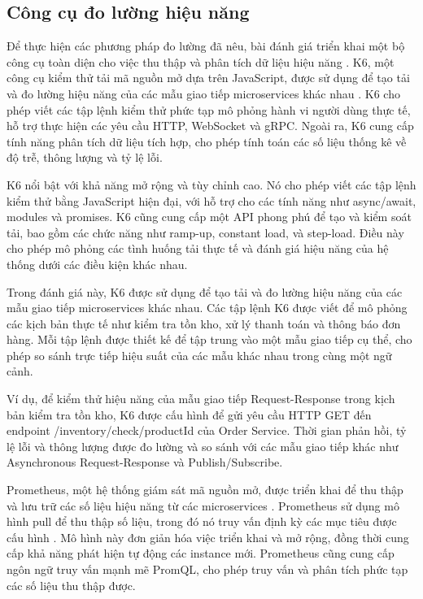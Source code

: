 \subsection{Công cụ đo lường hiệu năng}
Để thực hiện các phương pháp đo lường đã nêu, bài đánh giá triển khai một bộ công cụ toàn diện cho việc thu thập và phân tích dữ liệu hiệu năng \cite{aksakalli2021}. K6, một công cụ kiểm thử tải mã nguồn mở dựa trên JavaScript, được sử dụng để tạo tải và đo lường hiệu năng của các mẫu giao tiếp microservices khác nhau \cite{jun2018}. K6 cho phép viết các tập lệnh kiểm thử phức tạp mô phỏng hành vi người dùng thực tế, hỗ trợ thực hiện các yêu cầu HTTP, WebSocket và gRPC. Ngoài ra, K6 cung cấp tính năng phân tích dữ liệu tích hợp, cho phép tính toán các số liệu thống kê về độ trễ, thông lượng và tỷ lệ lỗi.

K6 nổi bật với khả năng mở rộng và tùy chỉnh cao. Nó cho phép viết các tập lệnh kiểm thử bằng JavaScript hiện đại, với hỗ trợ cho các tính năng như async/await, modules và promises. K6 cũng cung cấp một API phong phú để tạo và kiểm soát tải, bao gồm các chức năng như ramp-up, constant load, và step-load. Điều này cho phép mô phỏng các tình huống tải thực tế và đánh giá hiệu năng của hệ thống dưới các điều kiện khác nhau.

Trong đánh giá này, K6 được sử dụng để tạo tải và đo lường hiệu năng của các mẫu giao tiếp microservices khác nhau. Các tập lệnh K6 được viết để mô phỏng các kịch bản thực tế như kiểm tra tồn kho, xử lý thanh toán và thông báo đơn hàng. Mỗi tập lệnh được thiết kế để tập trung vào một mẫu giao tiếp cụ thể, cho phép so sánh trực tiếp hiệu suất của các mẫu khác nhau trong cùng một ngữ cảnh.

Ví dụ, để kiểm thử hiệu năng của mẫu giao tiếp Request-Response trong kịch bản kiểm tra tồn kho, K6 được cấu hình để gửi yêu cầu HTTP GET đến endpoint /inventory/check/{productId} của Order Service. Thời gian phản hồi, tỷ lệ lỗi và thông lượng được đo lường và so sánh với các mẫu giao tiếp khác như Asynchronous Request-Response và Publish/Subscribe.

Prometheus, một hệ thống giám sát mã nguồn mở, được triển khai để thu thập và lưu trữ các số liệu hiệu năng từ các microservices \cite{richardson2019}. Prometheus sử dụng mô hình pull để thu thập số liệu, trong đó nó truy vấn định kỳ các mục tiêu được cấu hình \cite{newman2015}. Mô hình này đơn giản hóa việc triển khai và mở rộng, đồng thời cung cấp khả năng phát hiện tự động các instance mới. Prometheus cũng cung cấp ngôn ngữ truy vấn mạnh mẽ PromQL, cho phép truy vấn và phân tích phức tạp các số liệu thu thập được.

